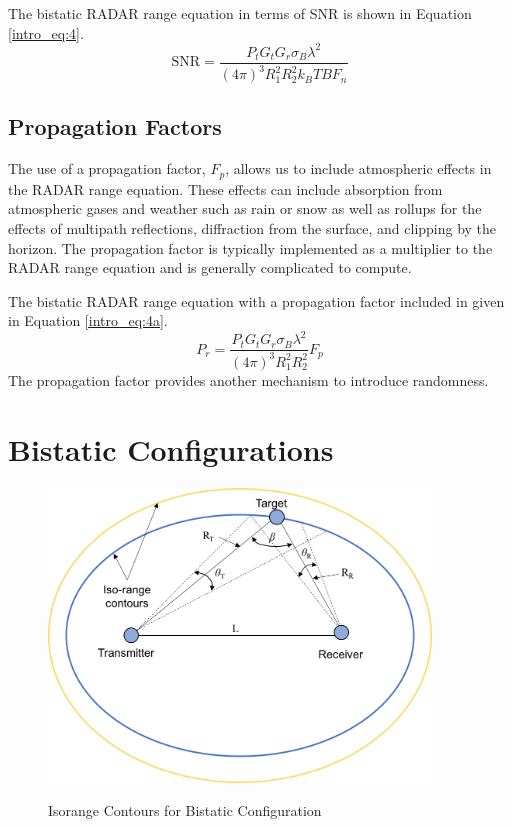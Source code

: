 The bistatic RADAR range equation in terms of SNR is shown in Equation \ref{intro_eq:4}.
\begin{equation}
    \label{intro_eq:4}
\text{SNR} = \frac{P_tG_tG_r\sigma_B\lambda^2}{\left(4\pi\right)^3 R_1^2R_2^2k_BTBF_n}
\end{equation}

\subsection{Propagation Factors}
The use of a propagation factor, $F_p$, allows us to include atmospheric effects in the RADAR range equation. These effects can include absorption from atmospheric gases and weather such as rain or snow as well as rollups for the effects of multipath reflections, diffraction from the surface, and clipping by the horizon. The propagation factor is typically implemented as a multiplier to the RADAR range equation and is generally complicated to compute. 

The bistatic RADAR range equation with a propagation factor included in given in Equation \ref{intro_eq:4a}.
  \begin{equation}
  \label{intro_eq:4a}
 P_r = \frac{P_tG_tG_r\sigma_B\lambda^2}{\left(4\pi\right)^3R_1^2R_2^2}F_p
  \end{equation}
The propagation factor provides another mechanism to introduce randomness.

\section{Bistatic Configurations}

\begin{figure}[H]
  \begin{center}
\includegraphics[width=4in]{../media/multistatic/Isorange_contours.png}
  \end{center}
  \renewcommand{\baselinestretch}{1} \small\normalsize
  \begin{quote}
    \caption[Isorange Contours for Bistatic Configuration]{Isorange Contours for Bistatic Configuration \label{intro_fig:2}}
  \end{quote}
\end{figure}
\renewcommand{\baselinestretch}{2} \small\normalsize

